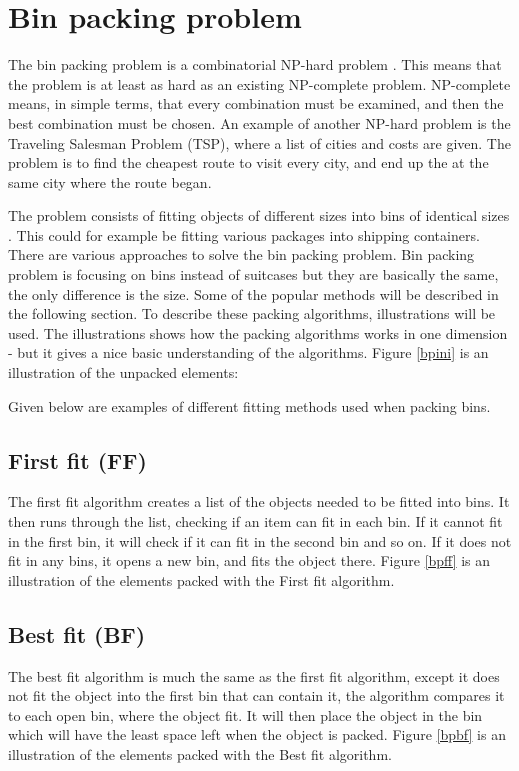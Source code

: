 \section{Bin packing problem}
\label{sec:binpacking}
The bin packing problem is a combinatorial NP-hard problem \citep{combopt}. This means that the problem is at least as hard as an existing NP-complete problem. NP-complete means, in simple terms, that every combination must be examined, and then the best combination must be chosen. An example of another NP-hard problem is the Traveling Salesman Problem (TSP), where a list of cities and costs are given. The problem is to find the cheapest route to visit every city, and end up the at the same city where the route began.  \citep{binpackingsource}

The problem consists of fitting objects of different sizes into bins of identical sizes \citep{appofdismath}. This could for example be fitting various packages into shipping containers. There are various approaches to solve the bin packing problem. Bin packing problem is focusing on bins instead of suitcases but they are basically the same, the only difference is the size. Some of the popular methods will be described in the following section. To describe these packing algorithms, illustrations will be used. The illustrations shows how the packing algorithms works in one dimension - but it gives a nice basic understanding of the algorithms. Figure \ref{bpini} is an illustration of the unpacked elements:

Given below are examples of different fitting methods used when packing bins.

\subsection{First fit (FF)}
The first fit algorithm creates a list of the objects needed to be fitted into bins. It then runs through the list, checking if an item can fit in each bin. If it cannot fit in the first bin, it will check if it can fit in the second bin and so on. If it does not fit in any bins, it opens a new bin, and fits the object there. Figure \ref{bpff} is an illustration of the elements packed with the First fit algorithm.

\subsection{Best fit (BF)}
The best fit algorithm is much the same as the first fit algorithm, except it does not fit the object into the first bin that can contain it, the algorithm compares it to each open bin, where the object fit. It will then place the object in the bin which will have the least space left when the object is packed. Figure \ref{bpbf} is an illustration of the elements packed with the Best fit algorithm.

